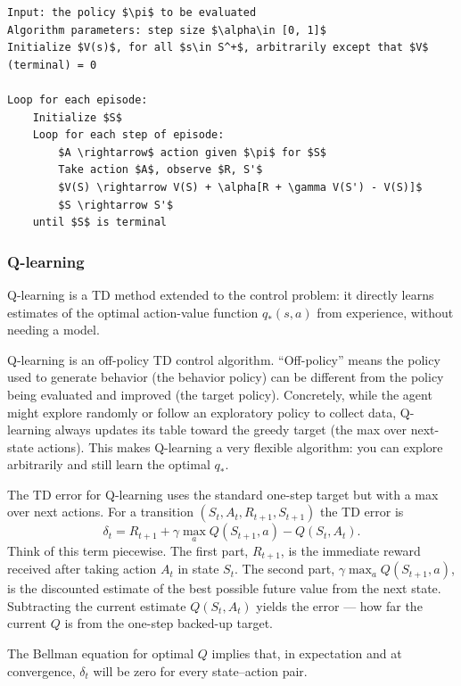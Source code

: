 \begin{lstlisting}[mathescape]
Input: the policy $\pi$ to be evaluated
Algorithm parameters: step size $\alpha\in [0, 1]$
Initialize $V(s)$, for all $s\in S^+$, arbitrarily except that $V$ (terminal) = 0

Loop for each episode:
    Initialize $S$
    Loop for each step of episode:
        $A \rightarrow$ action given $\pi$ for $S$
        Take action $A$, observe $R, S'$
        $V(S) \rightarrow V(S) + \alpha[R + \gamma V(S') - V(S)]$
        $S \rightarrow S'$
    until $S$ is terminal
\end{lstlisting}

\subsubsection{Q-learning}
Q-learning is a TD method extended to the control problem: it directly learns estimates of the optimal action-value function $q_*(s,a)$ from experience, without needing a model.

Q-learning is an off-policy TD control algorithm. “Off-policy” means the policy used to generate behavior (the behavior policy) can be different from the policy being evaluated and improved (the target policy). Concretely, while the agent might explore randomly or follow an exploratory policy to collect data, Q-learning always updates its table toward the greedy target (the max over next-state actions). This makes Q-learning a very flexible algorithm: you can explore arbitrarily and still learn the optimal $q_*$.

The TD error for Q-learning uses the standard one-step target but with a max over next actions. For a transition $(S_t,A_t,R_{t+1},S_{t+1})$ the TD error is
\begin{equation*}
    \delta_t = R_{t+1} + \gamma \max_a Q(S_{t+1},a) - Q(S_t,A_t).
\end{equation*}
Think of this term piecewise. The first part, $R_{t+1}$, is the immediate reward received after taking action $A_t$ in state $S_t$. The second part, $\gamma\max_aQ(S_{t+1},a)$, is the discounted estimate of the best possible future value from the next state. Subtracting the current estimate $Q(S_t,A_t)$ yields the error — how far the current $Q$ is from the one-step backed-up target.

The Bellman equation for optimal $Q$ implies that, in expectation and at convergence, $\delta_t$ will be zero for every state–action pair.


